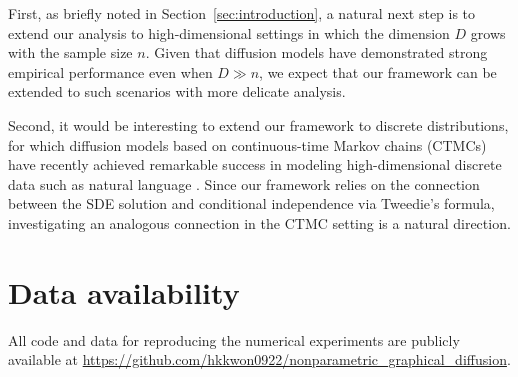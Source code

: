 \documentclass[11pt,a4paper,final]{article}
\numberwithin{equation}{section}
\theoremstyle{remark}
\newcommand{\bx}{{\bf x}}
\begin{document}
First, as briefly noted in Section~\ref{sec:introduction}, a natural next step is to extend our analysis to high-dimensional settings in which the dimension $D$ grows with the sample size $n$.
Given that diffusion models have demonstrated strong empirical performance even when $D \gg n$, we expect that our framework can be extended to such scenarios with more delicate analysis.


Second, it would be interesting to extend our framework to discrete distributions, for which diffusion models based on continuous-time Markov chains (CTMCs) have recently achieved remarkable success in modeling high-dimensional discrete data such as natural language \citep{lou2024discrete, khanna2025mercury}.
Since our framework relies on the connection between the SDE solution and conditional independence via Tweedie's formula, investigating an analogous connection in the CTMC setting is a natural direction.

\section*{Data availability}
All code and data for reproducing the numerical experiments are publicly available at \url{https://github.com/hkkwon0922/nonparametric_graphical_diffusion}.
\end{document}
